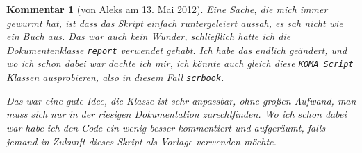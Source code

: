 \documentclass[a4paper, 12pt, numbers=noendperiod, chapterprefix=true]{scrbook}
\theoremstyle{break}
\theoremstyle{nonumberbreak}
\newtheorem{komm}{Kommentar}
\theoremstyle{nonumberplain}
\begin{document}
\begin{komm}[von Aleks am 13. Mai 2012]
Eine Sache, die mich immer gewurmt hat, ist dass das Skript einfach runtergeleiert aussah, es sah nicht wie ein Buch aus. Das war auch kein Wunder, schlie\ss lich hatte ich die Dokumentenklasse \verb!report! verwendet gehabt. Ich habe das endlich ge\"andert, und wo ich schon dabei war dachte ich mir, ich k\"onnte auch gleich diese \verb!KOMA Script! Klassen ausprobieren, also in diesem Fall \verb!scrbook!.

Das war eine gute Idee, die Klasse ist sehr anpassbar, ohne gro\ss en Aufwand, man muss sich nur in der riesigen Dokumentation zurechtfinden. Wo ich schon dabei war habe ich den Code ein wenig besser kommentiert und aufger\"aumt, falls jemand in Zukunft dieses Skript als Vorlage verwenden m\"ochte.
\end{komm}
\end{document}
